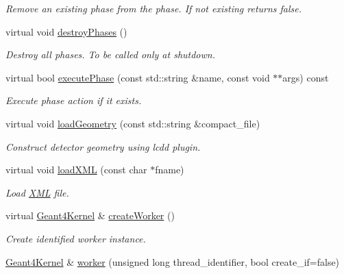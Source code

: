 \begin{DoxyCompactItemize}
\begin{DoxyCompactList}\small\item\em Remove an existing phase from the phase. If not existing returns false. \end{DoxyCompactList}\item 
virtual void \hyperlink{class_d_d4hep_1_1_simulation_1_1_geant4_kernel_af8c01fc03cdb8db95fafe071eee0ba5a}{destroy\+Phases} ()
\begin{DoxyCompactList}\small\item\em Destroy all phases. To be called only at shutdown. \end{DoxyCompactList}\item 
virtual bool \hyperlink{class_d_d4hep_1_1_simulation_1_1_geant4_kernel_a372116bbf95a9e9c63beb0906d8f222b}{execute\+Phase} (const std\+::string \&name, const void $\ast$$\ast$args) const
\begin{DoxyCompactList}\small\item\em Execute phase action if it exists. \end{DoxyCompactList}\item 
virtual void \hyperlink{class_d_d4hep_1_1_simulation_1_1_geant4_kernel_afe27ed5e3415cd381df461a28015ff81}{load\+Geometry} (const std\+::string \&compact\+\_\+file)
\begin{DoxyCompactList}\small\item\em Construct detector geometry using lcdd plugin. \end{DoxyCompactList}\item 
virtual void \hyperlink{class_d_d4hep_1_1_simulation_1_1_geant4_kernel_aaaab733198f5e548e23c5b97dfd0aa32}{load\+X\+ML} (const char $\ast$fname)
\begin{DoxyCompactList}\small\item\em Load \hyperlink{namespace_d_d4hep_1_1_x_m_l}{X\+ML} file. \end{DoxyCompactList}\item 
virtual \hyperlink{class_d_d4hep_1_1_simulation_1_1_geant4_kernel}{Geant4\+Kernel} \& \hyperlink{class_d_d4hep_1_1_simulation_1_1_geant4_kernel_a8d5bfc7d22e12f711950bd1c64173b74}{create\+Worker} ()
\begin{DoxyCompactList}\small\item\em Create identified worker instance. \end{DoxyCompactList}\item 
\hyperlink{class_d_d4hep_1_1_simulation_1_1_geant4_kernel}{Geant4\+Kernel} \& \hyperlink{class_d_d4hep_1_1_simulation_1_1_geant4_kernel_ac503376a3f593e2c97dcf78fb289fe49}{worker} (unsigned long thread\+\_\+identifier, bool create\+\_\+if=false)
$$
\end{DoxyCompactItemize}
